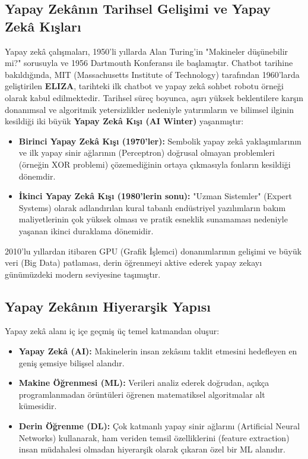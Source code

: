 \documentclass[11pt,a4paper,openany]{book}
\begin{document}
\needspace{9cm}
\subsection{Yapay Zekânın Tarihsel Gelişimi ve Yapay Zekâ Kışları}
Yapay zekâ çalışmaları, 1950'li yıllarda Alan Turing'in "Makineler düşünebilir mi?" sorusuyla ve 1956 Dartmouth Konferansı ile başlamıştır. Chatbot tarihine bakıldığında, MIT (Massachusetts Institute of Technology) tarafından 1960'larda geliştirilen \textbf{ELIZA}, tarihteki ilk chatbot ve yapay zekâ sohbet robotu örneği olarak kabul edilmektedir. Tarihsel süreç boyunca, aşırı yüksek beklentilere karşın donanımsal ve algoritmik yetersizlikler nedeniyle yatırımların ve bilimsel ilginin kesildiği iki büyük \textbf{Yapay Zekâ Kışı (AI Winter)} yaşanmıştır:
\begin{itemize}
    \item \textbf{Birinci Yapay Zekâ Kışı (1970'ler):} Sembolik yapay zekâ yaklaşımlarının ve ilk yapay sinir ağlarının (Perceptron) doğrusal olmayan problemleri (örneğin XOR problemi) çözemediğinin ortaya çıkmasıyla fonların kesildiği dönemdir.
    \item \textbf{İkinci Yapay Zekâ Kışı (1980'lerin sonu):} "Uzman Sistemler" (Expert Systems) olarak adlandırılan kural tabanlı endüstriyel yazılımların bakım maliyetlerinin çok yüksek olması ve pratik esneklik sunamaması nedeniyle yaşanan ikinci duraklama dönemidir.
\end{itemize}
2010'lu yıllardan itibaren GPU (Grafik İşlemci) donanımlarının gelişimi ve büyük veri (Big Data) patlaması, derin öğrenmeyi aktive ederek yapay zekayı günümüzdeki modern seviyesine taşımıştır.

\needspace{9cm}
\subsection{Yapay Zekânın Hiyerarşik Yapısı}
Yapay zekâ alanı iç içe geçmiş üç temel katmandan oluşur:
\begin{itemize}
    \item \textbf{Yapay Zekâ (AI):} Makinelerin insan zekâsını taklit etmesini hedefleyen en geniş şemsiye bilişsel alandır.
    \item \textbf{Makine Öğrenmesi (ML):} Verileri analiz ederek doğrudan, açıkça programlanmadan örüntüleri öğrenen matematiksel algoritmalar alt kümesidir.
    \item \textbf{Derin Öğrenme (DL):} Çok katmanlı yapay sinir ağlarını (Artificial Neural Networks) kullanarak, ham veriden temsil özelliklerini (feature extraction) insan müdahalesi olmadan hiyerarşik olarak çıkaran özel bir ML alanıdır.
\end{itemize}
\end{document}
